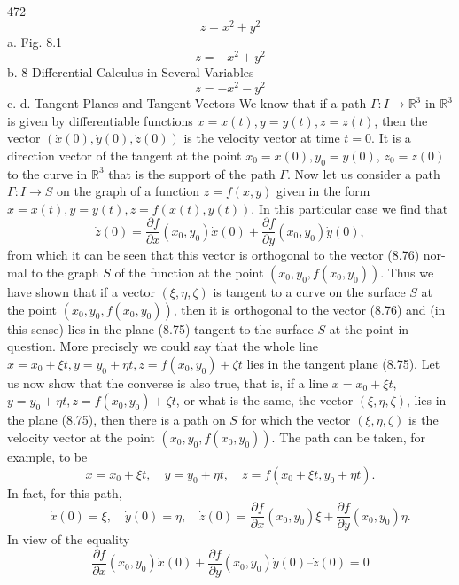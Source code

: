 472
$$z = x^2 + y^2$$
a.
Fig. 8.1
$$z = -x^2 + y^2$$
b.
8 Differential Calculus in Several Variables
$$z = -x^2 - y^2$$
c.
d. Tangent Planes and Tangent Vectors
We know that if a path $\Gamma : I \to \mathbb{R}^3$ in $\mathbb{R}^3$ is given by differentiable functions $x =
x(t), y = y(t), z = z(t)$, then the vector $(\dot{x}(0), \dot{y}(0), \dot{z}(0))$ is the velocity vector at
time $t = 0$. It is a direction vector of the tangent at the point $x_0 = x(0), y_0 = y(0)$,
$z_0 = z(0)$ to the curve in $\mathbb{R}^3$ that is the support of the path $\Gamma$.
Now let us consider a path $\Gamma : I \to S$ on the graph of a function $z = f(x, y)$
given in the form $x = x(t), y = y(t), z = f (x(t), y(t))$. In this particular case we
find that
$$\dot{z}(0) = \frac{\partial f}{\partial x}(x_0, y_0)\dot{x}(0) + \frac{\partial f}{\partial y}(x_0, y_0)\dot{y}(0),$$
from which it can be seen that this vector is orthogonal to the vector (8.76) nor-
mal to the graph $S$ of the function at the point $(x_0, y_0, f (x_0, y_0))$. Thus we have
shown that if a vector $(\xi, \eta, \zeta)$ is tangent to a curve on the surface $S$ at the point
$(x_0, y_0, f (x_0, y_0))$, then it is orthogonal to the vector (8.76) and (in this sense) lies
in the plane (8.75) tangent to the surface $S$ at the point in question. More precisely
we could say that the whole line $x = x_0 + \xi t, y = y_0 + \eta t, z = f (x_0, y_0) + \zeta t$ lies
in the tangent plane (8.75).
Let us now show that the converse is also true, that is, if a line $x = x_0 + \xi t$,
$y = y_0 + \eta t, z = f (x_0, y_0) + \zeta t$, or what is the same, the vector $(\xi, \eta, \zeta)$, lies in the
plane (8.75), then there is a path on $S$ for which the vector $(\xi, \eta, \zeta)$ is the velocity
vector at the point $(x_0, y_0, f (x_0, y_0))$.
The path can be taken, for example, to be
$$x = x_0 + \xi t, \quad y = y_0 + \eta t, \quad z = f (x_0 + \xi t, y_0 + \eta t).$$
In fact, for this path,
$$\dot{x}(0) = \xi, \quad \dot{y}(0) = \eta, \quad \dot{z}(0) = \frac{\partial f}{\partial x}(x_0, y_0)\xi + \frac{\partial f}{\partial y}(x_0, y_0)\eta.$$
In view of the equality
$$\frac{\partial f}{\partial x}(x_0, y_0)\dot{x}(0) + \frac{\partial f}{\partial y}(x_0, y_0)\dot{y}(0) – \dot{z}(0) = 0$$